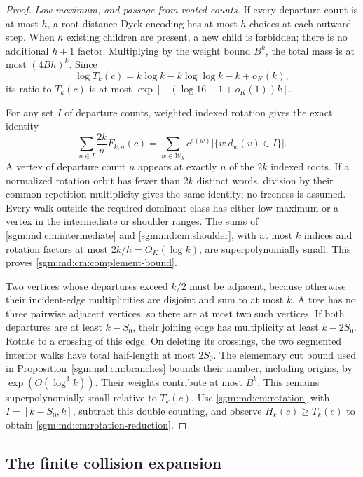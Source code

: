 \documentclass[11pt,letterpaper]{article}
\theoremstyle{remark}\newtheorem{remark}[theorem]{Remark}
\newcommand{\Wc}{\mathcal W}\newcommand{\Uc}{\mathcal U}\newcommand{\Part}{\operatorname{Part}}
\theoremstyle{definition}\newtheorem{definition}[theorem]{Definition}
\begin{document}
\begin{proof}
\emph{Low maximum, and passage from rooted counts.}
If every departure count is at most \(h\), a root-distance Dyck
encoding has at most \(h\) choices at each outward step.
When \(h\) existing children are present, a new child is forbidden;
there is no additional \(h+1\) factor.
Multiplying by the weight bound \(B^k\), the total mass is at most
\((4Bh)^k\). Since
\[
 \log T_k(c)=k\log k-k\log\log k-k+o_K(k),
\]
its ratio to \(T_k(c)\) is at most
\(\exp[-(\log16-1+o_K(1))k]\).

For any set \(I\) of departure counts, weighted indexed rotation
gives the exact identity
\begin{equation}\label{sgm:md:cm:rotation}
 \sum_{n\in I}\frac{2k}{n}F_{k,n}(c)
 =\sum_{w\in\Wc_k}c^{e(w)}
                |\{v:d_w(v)\in I\}|.
\end{equation}
A vertex of departure count \(n\) appears at exactly \(n\) of the
\(2k\) indexed roots. If a normalized rotation orbit has fewer than
\(2k\) distinct words, division by their common repetition
multiplicity gives the same identity; no freeness is assumed.
Every walk outside the required dominant class has either low
maximum or a vertex in the intermediate or shoulder ranges.
The sums of \eqref{sgm:md:cm:intermediate} and \eqref{sgm:md:cm:shoulder},
with at most \(k\) indices and rotation factors at most
\(2k/h=O_K(\log k)\), are superpolynomially small.
This proves \eqref{sgm:md:cm:complement-bound}.

Two vertices whose departures exceed \(k/2\) must be adjacent,
because otherwise their incident-edge multiplicities are disjoint
and sum to at most \(k\). A tree has no three pairwise adjacent
vertices, so there are at most two such vertices.
If both departures are at least \(k-S_0\), their joining edge
has multiplicity at least \(k-2S_0\).
Rotate to a crossing of this edge. On deleting its crossings,
the two segmented interior walks have total half-length at most
\(2S_0\). The elementary cut bound used in
Proposition~\ref{sgm:md:cm:branches} bounds their number, including origins,
by \(\exp(O(\log^3k))\).
Their weights contribute at most \(B^k\).
This remains superpolynomially small relative to \(T_k(c)\).
Use \eqref{sgm:md:cm:rotation} with \(I=[k-S_0,k]\),
subtract this double counting, and observe \(H_k(c)\ge T_k(c)\)
to obtain \eqref{sgm:md:cm:rotation-reduction}.
\end{proof}

\subsection{The finite collision expansion}
\end{document}
